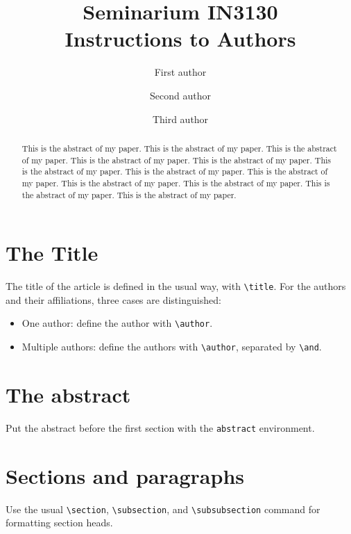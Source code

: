 \documentclass{article}
\title{Seminarium IN3130\\ Instructions to Authors}
\author{First author  \and
    Second author \and
    Third author}
\date{}
\begin{document}
\maketitle
\thispagestyle{empty}

\begin{abstract}
This is the abstract of my paper.
This is the abstract of my paper.
This is the abstract of my paper.
This is the abstract of my paper.
This is the abstract of my paper.
This is the abstract of my paper.
This is the abstract of my paper.
This is the abstract of my paper.
This is the abstract of my paper.
This is the abstract of my paper.
This is the abstract of my paper.
This is the abstract of my paper.
\end{abstract}


\section{The Title}

The title of the article is defined in the usual way, with \verb+\title+. For
the authors and their affiliations, three cases are distinguished:

\begin{itemize}
\item One author: define the author with \verb+\author+.
\item Multiple authors: define the authors with
   \verb+\author+, separated by \verb+\and+.
\end{itemize}


\section{The abstract}

Put the abstract before the first section with the \verb+abstract+
environment.


\section{Sections and paragraphs}

  Use the usual \verb+\section+, \verb+\subsection+, and
  \verb+\subsubsection+ command for formatting section heads.
\end{document}
